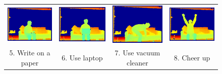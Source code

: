 \documentclass[final,3p,times,twocolumn]{elsarticle}
\begin{document}
\begin{figure}[t]
{\begin{tabular}{cccc}
			 \includegraphics[width=0.4\columnwidth]{Figures/MSRDaily3D_writeonapaper.pdf} &          \includegraphics[width=0.4\columnwidth]{Figures/MSRDaily3D_uselaptop.pdf} &          \includegraphics[width=0.4\columnwidth]{Figures/MSRDaily3D_usevacuumcleaner.pdf} &          \includegraphics[width=0.4\columnwidth]{Figures/MSRDaily3D_cheerup.pdf} \\
	  			
	        5. Write on a paper &          6. Use laptop &          7. Use vacuum cleaner &           8. Cheer up \\
	  			

\end{tabular}}
\end{figure}
\end{document}
